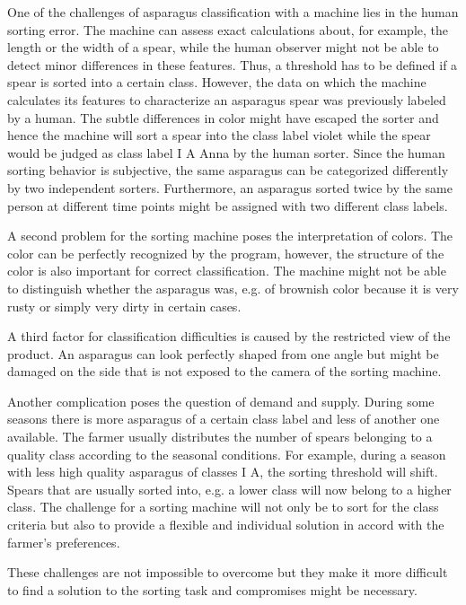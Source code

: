 One of the challenges of asparagus classification with a machine lies in the human sorting error. The machine can assess exact calculations about, for example, the length or the width of a spear, while the human observer might not be able to detect minor differences in these features. Thus, a threshold has to be defined if a spear is sorted into a certain class. However, the data on which the machine calculates its features to characterize an asparagus spear was previously labeled by a human. The subtle differences in color might have escaped the sorter and hence the machine will sort a spear into the class label violet while the spear would be judged as class label I A Anna by the human sorter. Since the human sorting behavior is subjective, the same asparagus can be categorized differently by two independent sorters. Furthermore, an asparagus sorted twice by the same person at different time points might be assigned with two different class labels.

A second problem for the sorting machine poses the interpretation of colors. The color can be perfectly recognized by the program, however, the structure of the color is also important for correct classification. The machine might not be able to distinguish whether the asparagus was, e.g. of brownish color because it is very rusty or simply very dirty in certain cases.

A third factor for classification difficulties is caused by the restricted view of the product. An asparagus can look perfectly shaped from one angle but might be damaged on the side that is not exposed to the camera of the sorting machine.

Another complication poses the question of demand and supply. During some seasons there is more asparagus of a certain class label and less of another one available. The farmer usually distributes the number of spears belonging to a quality class according to the seasonal conditions. For example, during a season with less high quality asparagus of classes I A, the sorting threshold will shift. Spears that are usually sorted into, e.g. a lower class will now belong to a higher class. The challenge for a sorting machine will not only be to sort for the class criteria but also to provide a flexible and individual solution in accord with the farmer’s preferences.

These challenges are not impossible to overcome but they make it more difficult to find a solution to the sorting task and compromises might be necessary. 
